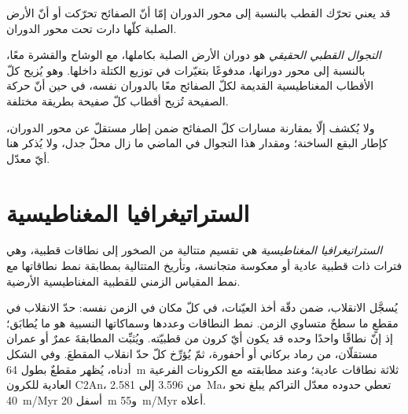 قد يعني تحرّك القطب بالنسبة إلى محور الدوران إمّا أنّ الصفائح
تحرّكت أو أنّ الأرض الصلبة كلّها دارت تحت محور الدوران.

\begin{definition}\label{def:b3:palaeomagnetism:tpw}
\emph{التجوال القطبي الحقيقي} هو دوران الأرض الصلبة بكاملها، مع
الوشاح والقشرة معًا، بالنسبة إلى محور دورانها، مدفوعًا
بتغيّرات في توزيع الكتلة داخلها. وهو يُزيح كلّ الأقطاب المغناطيسية القديمة
لكلّ الصفائح معًا بالدوران نفسه، في حين أنّ
حركة الصفيحة تُزيح أقطاب كلّ صفيحة بطريقة مختلفة.
\end{definition}

ولا يُكشف إلّا بمقارنة مسارات كلّ الصفائح ضمن إطار
مستقلّ عن محور الدوران، كإطار البقع الساخنة؛ ومقدار
هذا التجوال في الماضي ما زال محلّ جدل، ولا يُذكر هنا أيّ معدّل.

\section{الستراتيغرافيا المغناطيسية}

\begin{definition}\label{def:b3:palaeomagnetism:magnetostratigraphy}
\emph{الستراتيغرافيا المغناطيسية} هي تقسيم
متتالية من الصخور إلى نطاقات قطبية، وهي فترات ذات قطبية عادية أو معكوسة
متجانسة، وتأريخ المتتالية بمطابقة نمط نطاقاتها مع
نمط المقياس الزمني للقطبية المغناطيسية الأرضية.
\end{definition}

يُسجَّل الانقلاب، ضمن دقّة أخذ العيّنات، في كلّ مكان
في الزمن نفسه: حدّ الانقلاب في مقطعٍ ما سطحٌ متساوي الزمن.
نمط النطاقات وعددها وسماكاتها النسبية هو ما يُطابَق؛
إذ إنّ نطاقًا واحدًا وحده قد يكون أيّ كرون من قطبيّته. ويُثبِّت المطابقةَ عمرٌ أو عمران
مستقلّان، من رماد بركاني أو أحفورة، ثمّ
يُؤرِّخ كلّ حدّ انقلاب المقطعَ. وفي الشكل أدناه، يُظهر مقطعٌ بطول
\qty{64}{m} ثلاثة نطاقات عادية؛ وعند مطابقته مع الكرونات الفرعية العادية
للكرون C2An، من 3.596 إلى \qty{2.581}{Ma}، تعطي حدوده معدّل التراكم
يبلغ نحو \qty{40}{m/Myr} أسفل \qty{20}{m} و\qty{55}{m/Myr} أعلاه.

